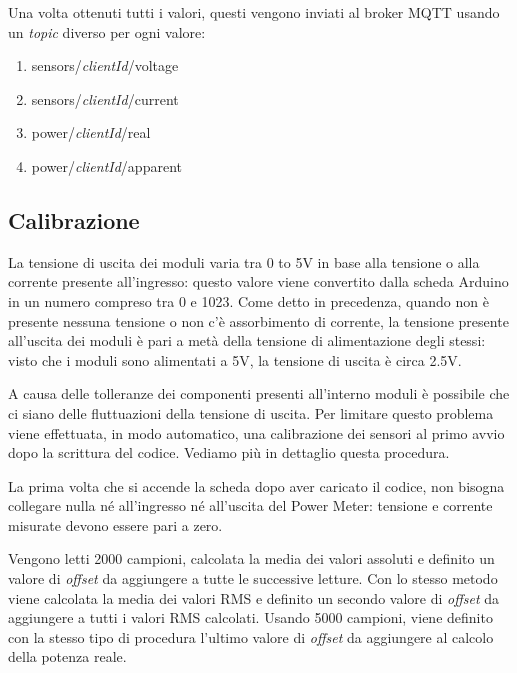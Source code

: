 \documentclass[italian,12pt,a4paper,oneside,final]{report}
\begin{document}
Una volta ottenuti tutti i valori, questi vengono inviati al broker MQTT usando un \emph{topic} diverso per ogni valore:

\begin{enumerate}
  \item[]sensors/\textit{clientId}/voltage
  \item[] sensors/\textit{clientId}/current
  \item[] power/\textit{clientId}/real
  \item[] power/\textit{clientId}/apparent
\end{enumerate}

\newpage

\subsection{Calibrazione}\label{section:calibrazione}
La tensione di uscita dei moduli varia tra 0 to 5V in base alla tensione o alla corrente presente all'ingresso: questo valore viene convertito dalla scheda Arduino in un numero compreso tra 0 e 1023.
Come detto in precedenza, quando non è presente nessuna tensione o non c'è assorbimento di corrente, la tensione presente all'uscita dei moduli è pari a metà della tensione di alimentazione degli stessi: visto che i moduli sono alimentati a 5V, la tensione di uscita è circa 2.5V.

A causa delle tolleranze dei componenti presenti all'interno moduli è possibile che ci siano delle fluttuazioni della tensione di uscita.
Per limitare questo problema viene effettuata, in modo automatico, una calibrazione dei sensori al primo avvio dopo la scrittura del codice.
Vediamo più in dettaglio questa procedura.

La prima volta che si accende la scheda dopo aver caricato il codice, non bisogna collegare nulla né all'ingresso né all'uscita del Power Meter: tensione e corrente misurate devono essere pari a zero.

Vengono letti 2000 campioni, calcolata la media dei valori assoluti e definito un valore di \textit{offset} da aggiungere a tutte le successive letture.
Con lo stesso metodo viene calcolata la media dei valori RMS e definito un secondo valore di \textit{offset} da aggiungere a tutti i valori RMS calcolati.
Usando 5000 campioni, viene definito con la stesso tipo di procedura l'ultimo valore di \textit{offset} da aggiungere al calcolo della potenza reale.
\end{document}
